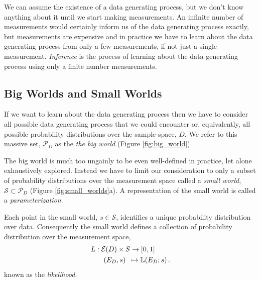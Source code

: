 We can assume the existence of a data generating process, 
but we don't know anything about it until we start making 
measurements.  An infinite number of measurements would 
certainly inform us of the data generating process exactly,
but measurements are expensive and in practice we have
to learn about the data generating process from only a few
measurements, if not just a single measurement. \emph{Inference}
is the process of learning about the data generating process
using only a finite number measurements.  

\subsection{Big Worlds and Small Worlds}

If we want to learn about the data generating process then we 
have to consider all possible data generating process that we 
could encounter or, equivalently, all possible probability distributions
over the sample space, $D$.  We refer to this massive set, 
$\mathcal{P}_{D}$ as the \emph{the big world} (Figure \ref{fig:big_world}).  

\begin{figure*}
\centering
{}
\caption{Once we have defined a measurement space, $D$, the latent data
generating process, $\pi_{D}$, must be contained in the space of all 
possible data generating processes over $D$, $\mathcal{P}_{D}$.
}
\label{fig:big_world}
\end{figure*}

The big world is much too ungainly to be even well-defined in 
practice, let alone exhaustively explored.  Instead we have to limit 
our consideration to only a subset of probability distributions over 
the measurement space called a \emph{small world}, $\mathcal{S} 
\subset \mathcal{P}_{D}$ (Figure \ref{fig:small_worlds}a).  A
representation of the small world is called a \emph{parameterization}.

Each point in the small world, $s \in \mathcal{S}$, identifies a unique 
probability distribution over data.  Consequently the small world defines 
a collection of probability distribution over the measurement space,
%
\begin{align*}
L
&:  \mathcal{E} \! \left( D \right)  \times S \rightarrow \left[0, 1 \right] \\
&\quad \left( E_{D}, s \right) \;\; \mapsto 
\mathbb{L} \! \left( E_{D} ; s \right).
\end{align*}
%
known as the \emph{likelihood}.  

